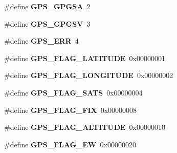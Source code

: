 \begin{DoxyCompactItemize}
\item 
\hypertarget{group___t_m___g_p_s___macros_ga4f7fb2d7454dace968c8243ba8da37a4}{}\#define {\bfseries G\+P\+S\+\_\+\+G\+P\+G\+S\+A}~2\label{group___t_m___g_p_s___macros_ga4f7fb2d7454dace968c8243ba8da37a4}

\item 
\hypertarget{group___t_m___g_p_s___macros_gaf407f50b998a3e0ea6bfdccd7cf06f50}{}\#define {\bfseries G\+P\+S\+\_\+\+G\+P\+G\+S\+V}~3\label{group___t_m___g_p_s___macros_gaf407f50b998a3e0ea6bfdccd7cf06f50}

\item 
\hypertarget{group___t_m___g_p_s___macros_ga1ab7860ffb618cd73e5c55551ef20aaa}{}\#define {\bfseries G\+P\+S\+\_\+\+E\+R\+R}~4\label{group___t_m___g_p_s___macros_ga1ab7860ffb618cd73e5c55551ef20aaa}

\item 
\hypertarget{group___t_m___g_p_s___macros_gac5529e01e540ec81a8e80ec0308854d2}{}\#define {\bfseries G\+P\+S\+\_\+\+F\+L\+A\+G\+\_\+\+L\+A\+T\+I\+T\+U\+D\+E}~0x00000001\label{group___t_m___g_p_s___macros_gac5529e01e540ec81a8e80ec0308854d2}

\item 
\hypertarget{group___t_m___g_p_s___macros_ga550aa6aec0ac42fcb27f9706ecee5ca9}{}\#define {\bfseries G\+P\+S\+\_\+\+F\+L\+A\+G\+\_\+\+L\+O\+N\+G\+I\+T\+U\+D\+E}~0x00000002\label{group___t_m___g_p_s___macros_ga550aa6aec0ac42fcb27f9706ecee5ca9}

\item 
\hypertarget{group___t_m___g_p_s___macros_gad8b53e8f2811b7ffea261a953e5dee96}{}\#define {\bfseries G\+P\+S\+\_\+\+F\+L\+A\+G\+\_\+\+S\+A\+T\+S}~0x00000004\label{group___t_m___g_p_s___macros_gad8b53e8f2811b7ffea261a953e5dee96}

\item 
\hypertarget{group___t_m___g_p_s___macros_ga11939dc15d5793d4d75853b22f9a891d}{}\#define {\bfseries G\+P\+S\+\_\+\+F\+L\+A\+G\+\_\+\+F\+I\+X}~0x00000008\label{group___t_m___g_p_s___macros_ga11939dc15d5793d4d75853b22f9a891d}

\item 
\hypertarget{group___t_m___g_p_s___macros_ga8f2c38d15738a24e88ed0632798a9d7a}{}\#define {\bfseries G\+P\+S\+\_\+\+F\+L\+A\+G\+\_\+\+A\+L\+T\+I\+T\+U\+D\+E}~0x00000010\label{group___t_m___g_p_s___macros_ga8f2c38d15738a24e88ed0632798a9d7a}

\item 
\hypertarget{group___t_m___g_p_s___macros_ga5b43481faf811bd80e10a752c1057152}{}\#define {\bfseries G\+P\+S\+\_\+\+F\+L\+A\+G\+\_\+\+E\+W}~0x00000020\label{group___t_m___g_p_s___macros_ga5b43481faf811bd80e10a752c1057152}


\end{DoxyCompactItemize}

